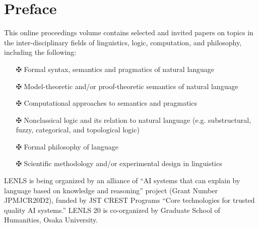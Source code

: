 \documentclass[12pt]{jarticle}
\begin{document}
\newpage

\vspace*{20cm}
\vfill
\begin{large}

\end{large}

\newpage
\pagestyle{plain}

\newpage
\section*{Preface}
This online proceedings volume contains selected and invited papers on topics in the inter-disciplinary fields of linguistics, logic, computation, and philosophy, including the following:
\begin{itemize}
\item[$\maltese$] Formal syntax, semantics and pragmatics of natural language
\item[$\maltese$] Model-theoretic and/or proof-theoretic semantics of natural language
\item[$\maltese$] Computational approaches to semantics and pragmatics
\item[$\maltese$] Nonclassical logic and its relation to natural language 
  (e.g. substructural, fuzzy, categorical, and topological logic)
\item[$\maltese$] Formal philosophy of language
\item[$\maltese$] Scientific methodology and/or experimental design in linguistics
\end{itemize}


LENLS is being organized by an alliance of ``AI systems that can explain by language based on knowledge and reasoning'' project (Grant Number JPMJCR20D2), funded by JST CREST Programs ``Core technologies for trusted quality AI systems.''  LENLS 20 is co-organized by Graduate School of Humanities, Osaka University.
\end{document}
